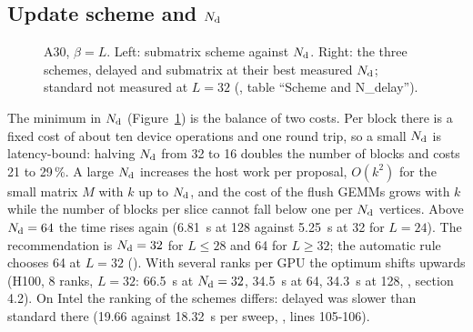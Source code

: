 \subsection{Update scheme and $N_{\rm d}$}

\begin{figure}[h]
\centering
{}
\caption{A30, $\beta=L$. Left: submatrix scheme against $N_{\rm d}$. Right: the three schemes, delayed and submatrix at their best measured $N_{\rm d}$; standard not measured at $L=32$ (, table ``Scheme and N\_delay'').}
\label{fig:ndelay}
\end{figure}

The minimum in $N_{\rm d}$ (Figure~\ref{fig:ndelay}) is the balance of two costs. Per block there is a fixed cost of about ten device operations and one round trip, so a small $N_{\rm d}$ is latency-bound: halving $N_{\rm d}$ from 32 to 16 doubles the number of blocks and costs 21 to 29\,\%. A large $N_{\rm d}$ increases the host work per proposal, $O(k^2)$ for the small matrix $M$ with $k$ up to $N_{\rm d}$, and the cost of the flush GEMMs grows with $k$ while the number of blocks per slice cannot fall below one per $N_{\rm d}$ vertices. Above $N_{\rm d}=64$ the time rises again (6.81~s at 128 against 5.25~s at 32 for $L=24$). The recommendation is $N_{\rm d}=32$ for $L\le28$ and 64 for $L\ge32$; the automatic rule chooses 64 at $L=32$ (). %
With several ranks per GPU the optimum shifts upwards (H100, 8 ranks, $L=32$: 66.5~s at $N_{\rm d}=32$, 34.5~s at 64, 34.3~s at 128, , section 4.2). %
On Intel the ranking of the schemes differs: delayed was slower than standard there (19.66 against 18.32~s per sweep, , lines 105-106). %

